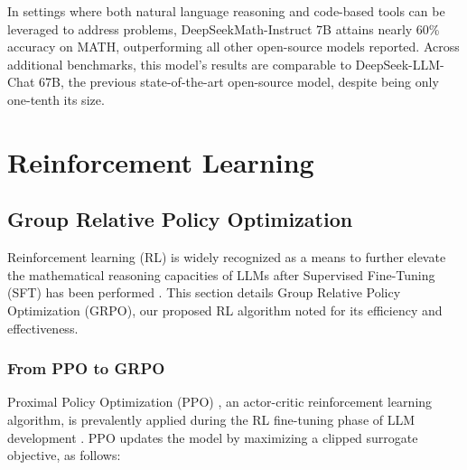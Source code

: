 In settings where both natural language reasoning and code-based tools can be leveraged to address problems, DeepSeekMath-Instruct 7B attains nearly 60\% accuracy on MATH, outperforming all other open-source models reported. Across additional benchmarks, this model’s results are comparable to DeepSeek-LLM-Chat 67B, the previous state-of-the-art open-source model, despite being only one-tenth its size.

\section{Reinforcement Learning}

\subsection{Group Relative Policy Optimization}

Reinforcement learning (RL) is widely recognized as a means to further elevate the mathematical reasoning capacities of LLMs after Supervised Fine-Tuning (SFT) has been performed \citep{wang2023math,wizardmath}. This section details Group Relative Policy Optimization (GRPO), our proposed RL algorithm noted for its efficiency and effectiveness.

\subsubsection{From PPO to GRPO} 

Proximal Policy Optimization (PPO) \citep{schulman2017proximal}, an actor-critic reinforcement learning algorithm, is prevalently applied during the RL fine-tuning phase of LLM development \citep{ouyang2022training}. PPO updates the model by maximizing a clipped surrogate objective, as follows:

